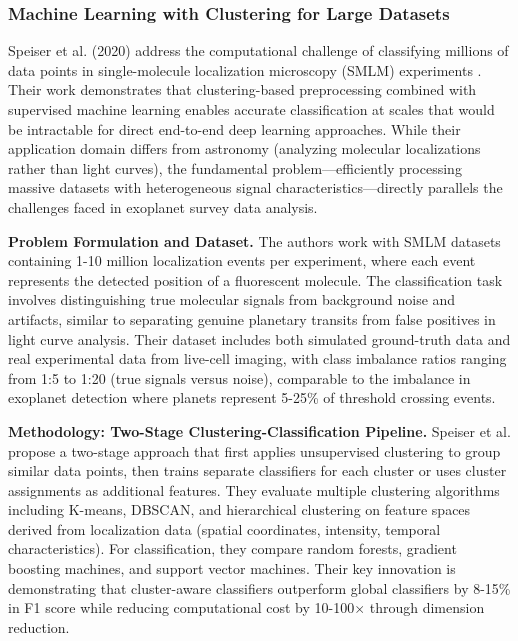 \documentclass[letterpaper]{article} %
\begin{document}
\subsubsection{Machine Learning with Clustering for Large Datasets}
Speiser et al. (2020) address the computational challenge of classifying millions of data points in single-molecule localization microscopy (SMLM) experiments \cite{Speiser2020clustering}. Their work demonstrates that clustering-based preprocessing combined with supervised machine learning enables accurate classification at scales that would be intractable for direct end-to-end deep learning approaches. While their application domain differs from astronomy (analyzing molecular localizations rather than light curves), the fundamental problem—efficiently processing massive datasets with heterogeneous signal characteristics—directly parallels the challenges faced in exoplanet survey data analysis.

\textbf{Problem Formulation and Dataset.} The authors work with SMLM datasets containing 1-10 million localization events per experiment, where each event represents the detected position of a fluorescent molecule. The classification task involves distinguishing true molecular signals from background noise and artifacts, similar to separating genuine planetary transits from false positives in light curve analysis. Their dataset includes both simulated ground-truth data and real experimental data from live-cell imaging, with class imbalance ratios ranging from 1:5 to 1:20 (true signals versus noise), comparable to the imbalance in exoplanet detection where planets represent 5-25\% of threshold crossing events.

\textbf{Methodology: Two-Stage Clustering-Classification Pipeline.} Speiser et al. propose a two-stage approach that first applies unsupervised clustering to group similar data points, then trains separate classifiers for each cluster or uses cluster assignments as additional features. They evaluate multiple clustering algorithms including K-means, DBSCAN, and hierarchical clustering on feature spaces derived from localization data (spatial coordinates, intensity, temporal characteristics). For classification, they compare random forests, gradient boosting machines, and support vector machines. Their key innovation is demonstrating that cluster-aware classifiers outperform global classifiers by 8-15\% in F1 score while reducing computational cost by 10-100$\times$ through dimension reduction.
\end{document}
